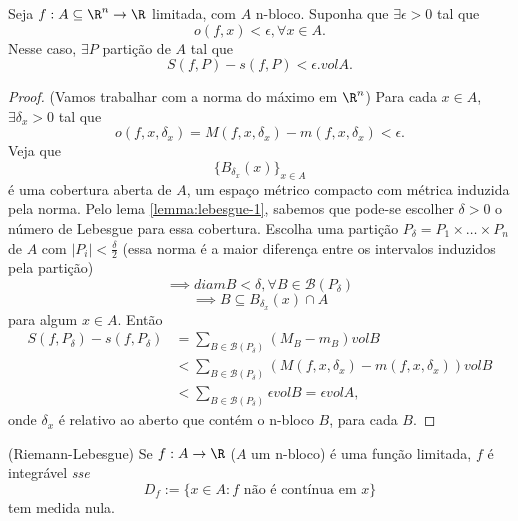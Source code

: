 \begin{lemma}\label{lemma:lebesgue-2}
    Seja $f:A\subseteq\R^{n}\to \R$ limitada, com $A$ n-bloco. Suponha que $\exists \epsilon>0$ tal que \[
    o\left( f, x \right) < \epsilon, \forall x\in A
    .\] Nesse caso, $\exists P$ partição de $A$ tal que \[
    S\left( f,P \right) -s\left( f, P \right) < \epsilon . vol A
    .\] 
\end{lemma}
\begin{proof}
    (Vamos trabalhar com a norma do máximo em $\R^{n}$)
    Para cada $x\in A$, $\exists \delta_x > 0$ tal que \[
    o\left( f, x, \delta_x \right) = M\left( f,x,\delta_x \right) -m\left( f,x,\delta_x \right) < \epsilon
.\] Veja que \[
\{B_{\delta_x}\left( x \right) \} _{x\in A}
\] é uma cobertura aberta de $A$, um espaço métrico compacto com métrica induzida pela norma.
Pelo lema \ref{lemma:lebesgue-1}, sabemos que pode-se escolher $\delta > 0$ o número de Lebesgue para essa cobertura. Escolha uma partição $P_\delta=P_1\times \ldots\times P_n$ de $A$ com $\left| P_i \right| < \frac{\delta}{2}$ (essa norma é a maior diferença entre os intervalos induzidos pela partição) \[
\implies diam B < \delta, \forall B\in \mathcal{B}\left( P_\delta \right) 
\] \[
\implies B\subseteq B_{\delta_x}\left( x \right) \cap A
\] para algum $x\in A$.
Então
\begin{align*}
    S\left( f,P_\delta \right) - s\left( f, P_\delta \right) &= \sum_{B\in \mathcal{B}\left( P_\delta \right) } \left( M_B - m_B \right) vol B \\
							     &<  \sum_{B\in \mathcal{B}\left( P_\delta \right) } \left( M\left( f,x,\delta_x \right) -m\left( f,x,\delta_x \right)  \right)  vol B \\
							     &<  \sum_{B\in \mathcal{B}\left( P_\delta \right) } \epsilon vol B = \epsilon vol A
,\end{align*}
onde $\delta_x$ é relativo ao aberto que contém o n-bloco $B$, para cada $B$.

\end{proof}

\begin{theorem}
    (Riemann-Lebesgue) Se $f:A\to \R$ ($A$ um n-bloco) é uma função limitada, $f$ é integrável \emph{sse} \[
    D_f := \{x\in A: f\text{ não é contínua em }x\} 
    \] tem medida nula.
\end{theorem}


